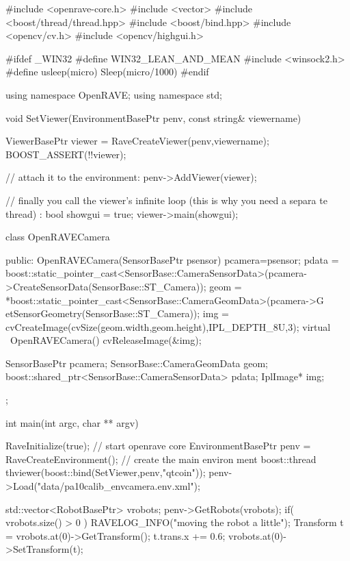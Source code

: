 \begin{DoxyCodeInclude}

#include <openrave-core.h>
#include <vector>
#include <boost/thread/thread.hpp>
#include <boost/bind.hpp>
#include <opencv/cv.h>
#include <opencv/highgui.h>

#ifdef _WIN32
#define WIN32_LEAN_AND_MEAN
#include <winsock2.h>
#define usleep(micro) Sleep(micro/1000)
#endif

using namespace OpenRAVE;
using namespace std;

void SetViewer(EnvironmentBasePtr penv, const string& viewername)
{
    ViewerBasePtr viewer = RaveCreateViewer(penv,viewername);
    BOOST_ASSERT(!!viewer);

    // attach it to the environment:
    penv->AddViewer(viewer);

    // finally you call the viewer's infinite loop (this is why you need a separa
      te thread) :
    bool showgui = true;
    viewer->main(showgui);
}

class OpenRAVECamera
{
public:
    OpenRAVECamera(SensorBasePtr psensor)
    {
        pcamera=psensor;
        pdata = boost::static_pointer_cast<SensorBase::CameraSensorData>(pcamera-
      >CreateSensorData(SensorBase::ST_Camera));
        geom = *boost::static_pointer_cast<SensorBase::CameraGeomData>(pcamera->G
      etSensorGeometry(SensorBase::ST_Camera));
        img = cvCreateImage(cvSize(geom.width,geom.height),IPL_DEPTH_8U,3);
    }
    virtual ~OpenRAVECamera() {
        cvReleaseImage(&img);
    }

    SensorBasePtr pcamera;
    SensorBase::CameraGeomData geom;
    boost::shared_ptr<SensorBase::CameraSensorData> pdata;
    IplImage* img;
};

int main(int argc, char ** argv)
{
    RaveInitialize(true); // start openrave core
    EnvironmentBasePtr penv = RaveCreateEnvironment(); // create the main environ
      ment
    boost::thread thviewer(boost::bind(SetViewer,penv,"qtcoin"));
    penv->Load("data/pa10calib_envcamera.env.xml");

    std::vector<RobotBasePtr> vrobots;
    penv->GetRobots(vrobots);
    if( vrobots.size() > 0 ) {
        RAVELOG_INFO("moving the robot a little\n");
        Transform t = vrobots.at(0)->GetTransform();
        t.trans.x += 0.6;
        vrobots.at(0)->SetTransform(t);
    }

}
\end{DoxyCodeInclude}

